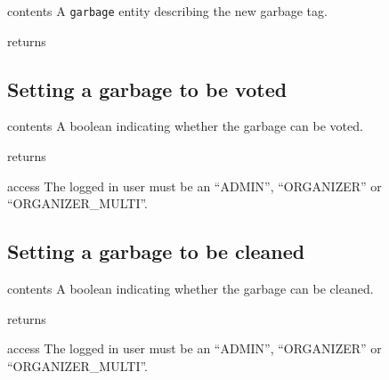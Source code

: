 \begin{apidata}{contents}
  A \texttt{garbage} entity describing the new garbage tag.
\end{apidata}
\begin{apidata}{returns}
  \begin{datalist}
  \end{datalist}
\end{apidata}

\subsection{Setting a garbage to be voted}

\begin{apidata}{contents}
  A boolean indicating whether the garbage can be voted.
\end{apidata}
\begin{apidata}{returns}
  \begin{datalist}
  \end{datalist}
\end{apidata}
\begin{apidata}{access}
The logged in user must be an ``ADMIN'', ``ORGANIZER'' or ``ORGANIZER\_MULTI''.
\end{apidata}

\subsection{Setting a garbage to be cleaned}

\begin{apidata}{contents}
  A boolean indicating whether the garbage can be cleaned.
\end{apidata}
\begin{apidata}{returns}
  \begin{datalist}
  \end{datalist}
\end{apidata}
\begin{apidata}{access}
The logged in user must be an ``ADMIN'', ``ORGANIZER'' or ``ORGANIZER\_MULTI''.
\end{apidata}

